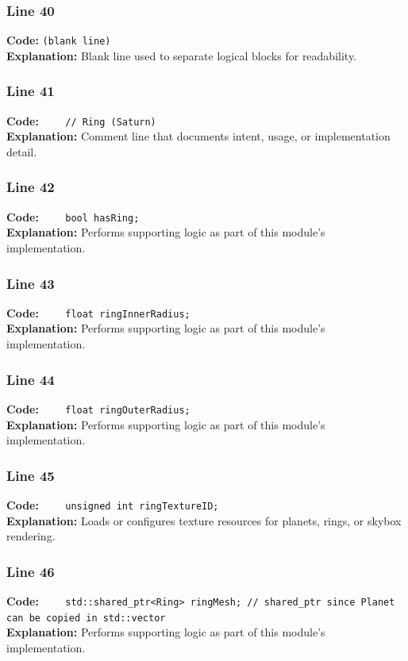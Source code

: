 \documentclass[11pt,a4paper]{article}
\begin{document}
\subsubsection*{Line 40}
\textbf{Code:} \texttt{(blank line)}\\
\textbf{Explanation:} Blank line used to separate logical blocks for readability.

\subsubsection*{Line 41}
\textbf{Code:} \verb|    // Ring (Saturn)|\\
\textbf{Explanation:} Comment line that documents intent, usage, or implementation detail.

\subsubsection*{Line 42}
\textbf{Code:} \verb|    bool hasRing;|\\
\textbf{Explanation:} Performs supporting logic as part of this module's implementation.

\subsubsection*{Line 43}
\textbf{Code:} \verb|    float ringInnerRadius;|\\
\textbf{Explanation:} Performs supporting logic as part of this module's implementation.

\subsubsection*{Line 44}
\textbf{Code:} \verb|    float ringOuterRadius;|\\
\textbf{Explanation:} Performs supporting logic as part of this module's implementation.

\subsubsection*{Line 45}
\textbf{Code:} \verb|    unsigned int ringTextureID;|\\
\textbf{Explanation:} Loads or configures texture resources for planets, rings, or skybox rendering.

\subsubsection*{Line 46}
\textbf{Code:} \verb|    std::shared_ptr<Ring> ringMesh; // shared_ptr since Planet can be copied in std::vector|\\
\textbf{Explanation:} Performs supporting logic as part of this module's implementation.
\end{document}
